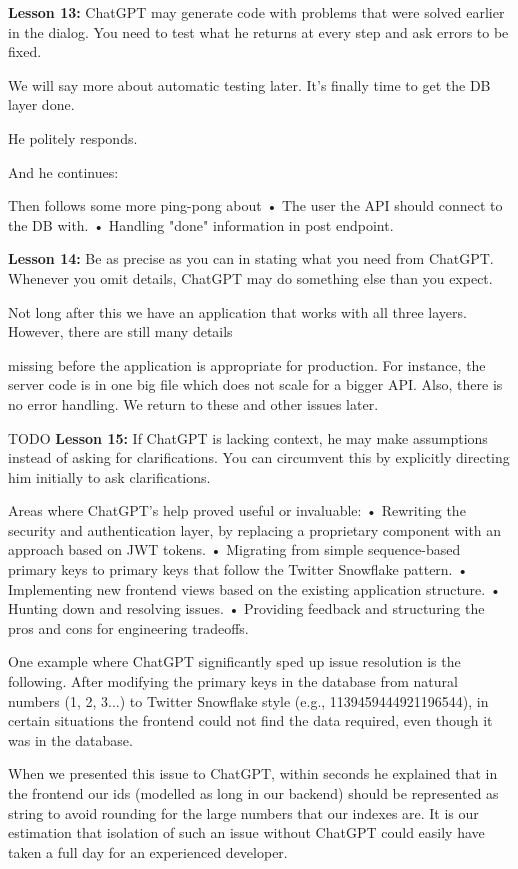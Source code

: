 \documentclass[runningheads]{llncs}
\begin{document}
\textbf{Lesson 13:} ChatGPT may generate code with problems that were solved earlier in the dialog. You need to test what he returns at every step and ask errors to be fixed.

We will say more about automatic testing later. It's finally time to get the DB layer done.

He politely responds.

And he continues:

Then follows some more ping-pong about
• The user the API should connect to the DB with.
• Handling "done" information in post endpoint.

\textbf{Lesson 14:} Be as precise as you can in stating what you need from ChatGPT. Whenever you omit details, ChatGPT may do something else than you expect.

Not long after this we have an application that works with all three layers. However, there are still many details

missing before the application is appropriate for production. For instance, the server code is in one big file which does not scale for a bigger API. Also, there is no error handling. We return to these and other issues later.

TODO
\textbf{Lesson 15:} If ChatGPT is lacking context, he may make assumptions instead of asking for clarifications. You can circumvent this by explicitly directing him initially to ask clarifications.

Areas where ChatGPT's help proved useful or invaluable:
• Rewriting the security and authentication layer,
by replacing a proprietary component with an
approach based on JWT tokens.
• Migrating from simple sequence-based primary
keys to primary keys that follow the Twitter
Snowflake pattern.
• Implementing new frontend views based on the
existing application structure.
• Hunting down and resolving issues.
• Providing feedback and structuring the pros and
cons for engineering tradeoffs.

One example where ChatGPT significantly sped up issue resolution is the following. After modifying the primary keys in the database from natural numbers (1, 2, 3...) to Twitter Snowflake style (e.g., 1139459444921196544), in certain situations the frontend could not find the data required, even though it was in the database.

When we presented this issue to ChatGPT, within seconds he explained that in the frontend our ids (modelled as long in our backend) should be represented as string to avoid rounding for the large numbers that our indexes are. It is our estimation that isolation of such an issue without ChatGPT could easily have taken a full day for an experienced developer.
\end{document}

